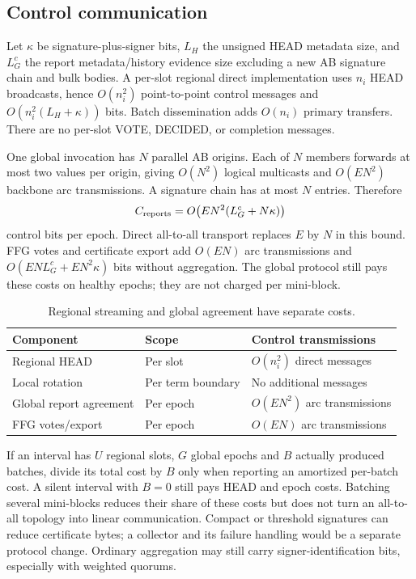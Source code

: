 \documentclass[11pt,a4paper,onecolumn]{article}
\theoremstyle{remark}\newtheorem{example}[definition]{Example}
\newcounter{protocol}
\begin{document}
\subsection{Control communication}\label{sec:controlcost}
Let $\kappa$ be signature-plus-signer bits, $L_H$ the unsigned HEAD metadata
size, and $L_G^c$ the report metadata/history evidence size excluding a new AB
signature chain and bulk bodies. A per-slot regional direct implementation
uses $n_i$ HEAD broadcasts, hence $O(n_i^2)$ point-to-point control messages
and $O(n_i^2(L_H+\kappa))$ bits. Batch dissemination adds $O(n_i)$ primary
transfers. There are no per-slot VOTE, DECIDED, or completion messages.

One global invocation has $N$ parallel AB origins. Each of $N$ members
forwards at most two values per origin, giving $O(N^2)$ logical multicasts
and $O(EN^2)$ backbone arc transmissions. A signature chain has at most
$N$ entries. Therefore
\[
 C_{\rm reports}=O\bigl(EN^2(L_G^c+N\kappa)\bigr)
\]
control bits per epoch. Direct all-to-all transport replaces $E$ by $N$ in
this bound. FFG votes and certificate export add $O(EN)$ arc transmissions
and $O(ENL_G^c+EN^2\kappa)$ bits without aggregation. The global protocol
still pays these costs on healthy epochs; they are not charged per mini-block.

\begin{table}[htbp]\centering\small
\begin{tabularx}{\textwidth}{@{}p{}p{}Y@{}}\toprule
Component & Scope & Control transmissions\\\midrule
Regional HEAD & Per slot & $O(n_i^2)$ direct messages\\
Local rotation & Per term boundary & No additional messages\\
Global report agreement & Per epoch & $O(EN^2)$ arc transmissions\\
FFG votes/export & Per epoch & $O(EN)$ arc transmissions\\\bottomrule
\end{tabularx}
\caption{Regional streaming and global agreement have separate costs.}
\end{table}
If an interval has $U$ regional slots, $G$ global epochs and $B$ actually
produced batches, divide its total cost by $B$ only when reporting an amortized
per-batch cost. A silent interval with $B=0$ still pays HEAD and epoch costs.
Batching several mini-blocks reduces their share of these costs but does not
turn an all-to-all topology into linear communication. Compact or threshold
signatures can reduce certificate bytes; a collector and its failure handling
would be a separate protocol change. Ordinary aggregation may still carry
signer-identification bits, especially with weighted quorums.
\end{document}
